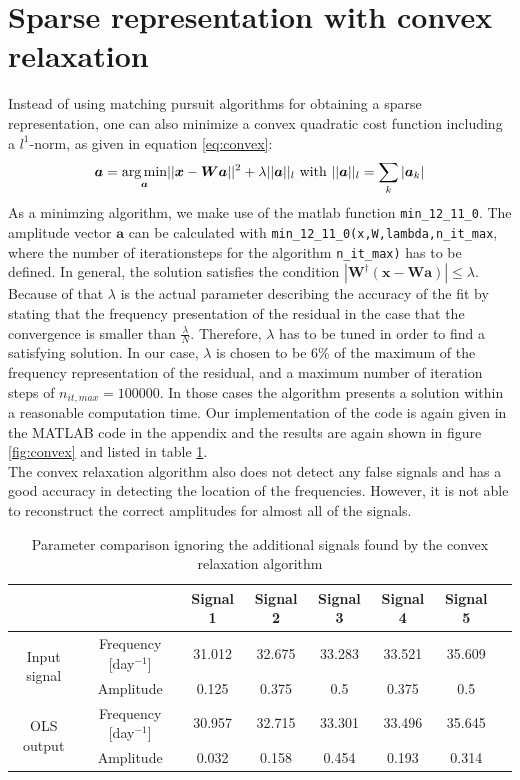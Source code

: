 \section{Sparse representation with convex relaxation}
Instead of using matching pursuit algorithms for obtaining a sparse representation, one can also minimize a convex quadratic cost function including a $l^{1}$-norm, as given in equation \ref{eq:convex}:
\begin{equation}
\boldsymbol{a}=\underset{\boldsymbol{a}}{\operatorname*{arg\,min}} ||\boldsymbol{x} - \boldsymbol{Wa} ||^{2} +\lambda ||\boldsymbol{a}||_{l} \text{ with } ||\boldsymbol{a}||_{l} =\sum_{k}|\boldsymbol{a}_{k} |
\label{eq:convex}
\end{equation}
As a minimzing algorithm, we make use of the matlab function \texttt{min\_12\_11\_0}. The amplitude vector $\boldsymbol{a}$ can be calculated with \texttt{min\_12\_11\_0(x,W,lambda,n\_it\_max}, where the number of iterationsteps for the algorithm \texttt{n\_it\_max)} has to be defined. In general, the solution satisfies the condition $|\boldsymbol{W}^{\dag}\left(\boldsymbol{x}-\boldsymbol{Wa} \right)| \leq\lambda $. Because of that $\lambda$ is the actual parameter describing the accuracy of the fit by stating that the frequency presentation of the residual in the case that the convergence is smaller than $\frac{\lambda}{N}$. Therefore, $\lambda$ has to be tuned in order to find a satisfying solution. In our case, $\lambda $ is chosen to be 6\% of the maximum of the frequency representation of the residual, and a maximum number of iteration steps of $n_{it,max}= 100000$. In those cases the algorithm presents a solution within a reasonable computation time. Our implementation of the code is again given in the MATLAB code in the appendix and the results are again shown in figure \ref{fig:convex} and listed in table \ref{tab:convex}.\\
The convex relaxation algorithm also does not detect any false signals and has a good accuracy in detecting the location of the frequencies. However, it is not able to reconstruct the correct amplitudes for almost all of the signals.


\begin{table}[h!]
\centering
\begin{tabular}{ | c| c| c| c| c| c|c|c| }
\hline
	&   & Signal 1 & Signal 2 & Signal 3 & Signal 4 & Signal 5 \\ \hline
\multirow{2}{3cm}{Input signal} & Frequency [day$^{-1}$] & 31.012 & 32.675 & 33.283 & 33.521 & 35.609 \\ \cline{2-7}
 & Amplitude & 0.125 & 0.375 & 0.5 & 0.375 & 0.5 \\ \hline

\multirow{2}{3cm}{OLS output} & Frequency [day$^{-1}$] &30.957  & 32.715 & 33.301 & 33.496  & 35.645  \\ \cline{2-7}
 & Amplitude & 0.032 & 0.158 & 0.454  & 0.193  & 0.314 \\ \hline

\end{tabular}
\caption{Parameter comparison ignoring the additional signals found by the convex relaxation algorithm}
\label{tab:convex}
\end{table}


